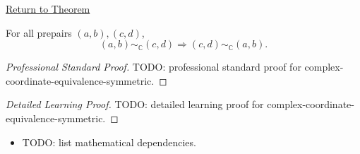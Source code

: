 \newpage
{}
\label{prf:complex-coordinate-equivalence-symmetric}

\begin{remark*}[Return]
\hyperref[lem:complex-coordinate-equivalence-symmetric]{Return to Theorem}
\end{remark*}

\begin{lemma*}
For all prepairs $(a,b),(c,d)$,
\[
(a,b)\sim_{\mathbb{C}}(c,d)
\Longrightarrow
(c,d)\sim_{\mathbb{C}}(a,b).
\]
\end{lemma*}

\begin{proof}[Professional Standard Proof]
\LRAProofBodyStart
TODO: professional standard proof for complex-coordinate-equivalence-symmetric.
\end{proof}

\begin{proof}[Detailed Learning Proof]
\LRAProofBodyStart
TODO: detailed learning proof for complex-coordinate-equivalence-symmetric.
\end{proof}

\begin{remark*}
\end{remark*}

\begin{dependencies}
\begin{itemize}
  \item TODO: list mathematical dependencies.
\end{itemize}
\end{dependencies}

\clearpage
